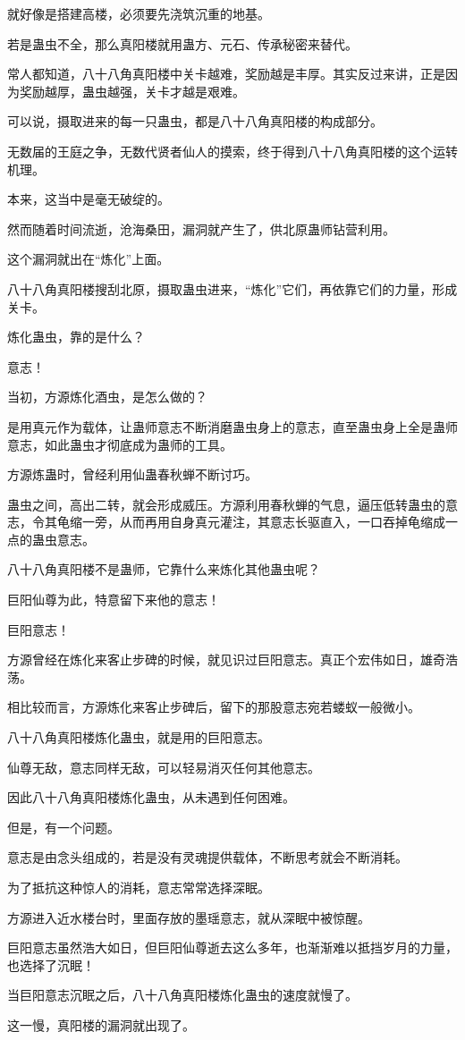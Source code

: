 \begin{this_body}
就好像是搭建高楼，必须要先浇筑沉重的地基。

若是蛊虫不全，那么真阳楼就用蛊方、元石、传承秘密来替代。

常人都知道，八十八角真阳楼中关卡越难，奖励越是丰厚。其实反过来讲，正是因为奖励越厚，蛊虫越强，关卡才越是艰难。

可以说，摄取进来的每一只蛊虫，都是八十八角真阳楼的构成部分。

无数届的王庭之争，无数代贤者仙人的摸索，终于得到八十八角真阳楼的这个运转机理。

本来，这当中是毫无破绽的。

然而随着时间流逝，沧海桑田，漏洞就产生了，供北原蛊师钻营利用。

这个漏洞就出在“炼化”上面。

八十八角真阳楼搜刮北原，摄取蛊虫进来，“炼化”它们，再依靠它们的力量，形成关卡。

炼化蛊虫，靠的是什么？

意志！

当初，方源炼化酒虫，是怎么做的？

是用真元作为载体，让蛊师意志不断消磨蛊虫身上的意志，直至蛊虫身上全是蛊师意志，如此蛊虫才彻底成为蛊师的工具。

方源炼蛊时，曾经利用仙蛊春秋蝉不断讨巧。

蛊虫之间，高出二转，就会形成威压。方源利用春秋蝉的气息，逼压低转蛊虫的意志，令其龟缩一旁，从而再用自身真元灌注，其意志长驱直入，一口吞掉龟缩成一点的蛊虫意志。

八十八角真阳楼不是蛊师，它靠什么来炼化其他蛊虫呢？

巨阳仙尊为此，特意留下来他的意志！

巨阳意志！

方源曾经在炼化来客止步碑的时候，就见识过巨阳意志。真正个宏伟如日，雄奇浩荡。

相比较而言，方源炼化来客止步碑后，留下的那股意志宛若蝼蚁一般微小。

八十八角真阳楼炼化蛊虫，就是用的巨阳意志。

仙尊无敌，意志同样无敌，可以轻易消灭任何其他意志。

因此八十八角真阳楼炼化蛊虫，从未遇到任何困难。

但是，有一个问题。

意志是由念头组成的，若是没有灵魂提供载体，不断思考就会不断消耗。

为了抵抗这种惊人的消耗，意志常常选择深眠。

方源进入近水楼台时，里面存放的墨瑶意志，就从深眠中被惊醒。

巨阳意志虽然浩大如日，但巨阳仙尊逝去这么多年，也渐渐难以抵挡岁月的力量，也选择了沉眠！

当巨阳意志沉眠之后，八十八角真阳楼炼化蛊虫的速度就慢了。

这一慢，真阳楼的漏洞就出现了。

\end{this_body}

